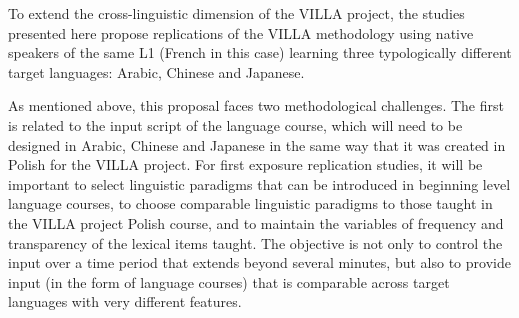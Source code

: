 \documentclass[output=paper,colorlinks,citecolor=brown,modfonts,nonflat]{../langscibook}
\begin{document}
To extend the cross-linguistic dimension of the VILLA project, the studies presented here propose replications of the VILLA methodology using native speakers of the same L1 (French in this case) learning three typologically different target languages: Arabic, Chinese and Japanese.

As mentioned above, this proposal faces two methodological challenges. The first is related to the input script of the language course, which will need to be designed in Arabic, Chinese and Japanese in the same way that it was created in Polish for the VILLA project. For first exposure replication studies, it will be important to select linguistic paradigms that can be introduced in beginning level language courses, to choose comparable linguistic paradigms to those taught in the VILLA project Polish course, and to maintain the variables of frequency and transparency of the lexical items taught. The objective is not only to control the input over a time period that extends beyond several minutes, but also to provide input (in the form of language courses) that is comparable across target languages with very different features.
\end{document}
